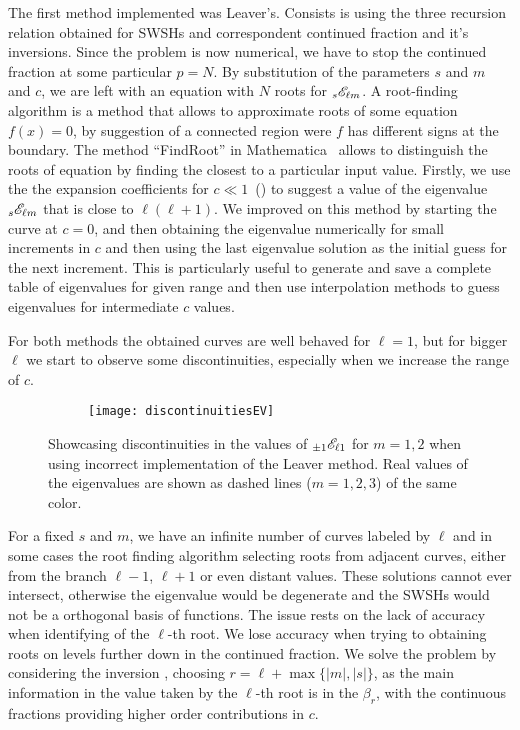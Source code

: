 The first method implemented was Leaver's.
Consists is using the three recursion relation obtained for SWSHs and correspondent continued fraction  and it's inversions.
Since the problem is now numerical, we have to stop the continued fraction at some particular $p=N$.
By substitution of the parameters $s$ and $m$ and $c$, we are left with an equation with $N$ roots for $\uu[s]{\mathscr{E}}{\ell m}$.
A root-finding algorithm is a method that allows to approximate roots of some equation $f(x)=0$, by suggestion of a connected region were $f$ has different signs at the boundary.
The method ``FindRoot'' in Mathematica\texttrademark~ allows to distinguish the roots of equation by finding the closest to a particular input value.
Firstly, we use the the expansion coefficients for $c\ll 1$~() to suggest a value of the eigenvalue $\uu[s]{\mathscr{E}}{\ell m}$ that is close to $\ell(\ell+1)$.
We improved on this method by starting the curve at $c=0$, and then obtaining the eigenvalue numerically for small increments in $c$ and then using the last eigenvalue solution as the initial guess for the next increment.
This is particularly useful to generate and save a complete table of eigenvalues for given range and then use interpolation methods to guess eigenvalues for intermediate $c$ values.

For both methods the obtained curves are well behaved for $\ell=1$, but for bigger $\ell$ we start to observe some discontinuities, especially when we increase the range of $c$.
\begin{figure}[h]
	\centering
	\vspace{0.2cm}
	\begin{subfigure}[c]{0.6\textwidth}
        \texttt{[image: discontinuitiesEV]}
    \end{subfigure}
	\caption{Showcasing discontinuities in the values of $\uu[\pm 1]{\mathscr{E}}{\ell 1}$ for $m=1,2$ when using incorrect implementation of the Leaver method. Real values of the eigenvalues are shown as dashed lines ($m=1,2,3$) of the same color.}
	\label{fig4:discontinuitiesEV}
\end{figure}
For a fixed $s$ and $m$, we have an infinite number of curves labeled by $\ell$ and in some cases the root finding algorithm selecting roots from adjacent curves, either from the branch $\ell-1$, $\ell+1$ or even distant values.
These solutions cannot ever intersect, otherwise the eigenvalue would be degenerate and the SWSHs would not be a orthogonal basis of functions.
The issue rests on the lack of accuracy when identifying of the $\ell$-th root.
We lose accuracy when trying to obtaining roots on levels further down in the continued fraction.
We solve the problem by considering the inversion , choosing $r=\ell+\max\{|m|,|s|\}$, as the main information in the value taken by the $\ell$-th root is in the $\beta_r$, with the continuous fractions providing higher order contributions in $c$.

